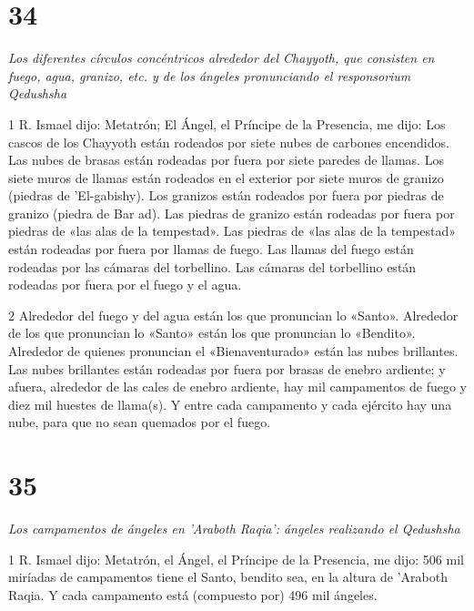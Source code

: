 \chapter{34}

\par \textit{Los diferentes círculos concéntricos alrededor del Chayyoth, que consisten en fuego, agua, granizo, etc. y de los ángeles pronunciando el responsorium Qedushsha}

\par 1 R. Ismael dijo: Metatrón; El Ángel, el Príncipe de la Presencia, me dijo: Los cascos de los Chayyoth están rodeados por siete nubes de carbones encendidos. Las nubes de brasas están rodeadas por fuera por siete paredes de llamas. Los siete muros de llamas están rodeados en el exterior por siete muros de granizo (piedras de 'El-gabishy). Los granizos están rodeados por fuera por piedras de granizo (piedra de Bar ad). Las piedras de granizo están rodeadas por fuera por piedras de «las alas de la tempestad». Las piedras de «las alas de la tempestad» están rodeadas por fuera por llamas de fuego. Las llamas del fuego están rodeadas por las cámaras del torbellino. Las cámaras del torbellino están rodeadas por fuera por el fuego y el agua.

\par 2 Alrededor del fuego y del agua están los que pronuncian lo «Santo». Alrededor de los que pronuncian lo «Santo» están los que pronuncian lo «Bendito». Alrededor de quienes pronuncian el «Bienaventurado» están las nubes brillantes. Las nubes brillantes están rodeadas por fuera por brasas de enebro ardiente; y afuera, alrededor de las cales de enebro ardiente, hay mil campamentos de fuego y diez mil huestes de llama(s). Y entre cada campamento y cada ejército hay una nube, para que no sean quemados por el fuego.

\chapter{35}

\par \textit{Los campamentos de ángeles en 'Araboth Raqia': ángeles realizando el Qedushsha}

\par 1 R. Ismael dijo: Metatrón, el Ángel, el Príncipe de la Presencia, me dijo: 506 mil miríadas de campamentos tiene el Santo, bendito sea, en la altura de 'Araboth Raqia. Y cada campamento está (compuesto por) 496 mil ángeles.

